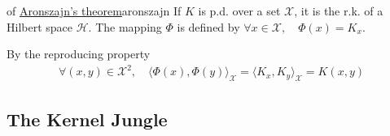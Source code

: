 \documentclass{article}
\begin{document}
\begin{Proof}{of \hyperref[thm:aronszajn]{Aronszajn's theorem}}{aronszajn}
  If $K$ is p.d. over a set $\mathcal{X}$, it is the r.k. of a Hilbert space 
  $\mathcal{H}$. The mapping $\Phi$ is defined by $\forall x \in \mathcal{X}, 
  \quad \Phi(x) = K_x$.

  By the reproducing property 
  \begin{align*}
    \forall (x,y)\in \mathcal{X}^2,\quad \langle \Phi(x), \Phi(y) 
    \rangle_\mathcal{X} = \langle K_x, K_y \rangle_\mathcal{X} = K(x, y)
  \end{align*}
\end{Proof}


\subsection{The Kernel Jungle}

\begin{Proof}{}{}
  
\end{Proof}
\end{document}
